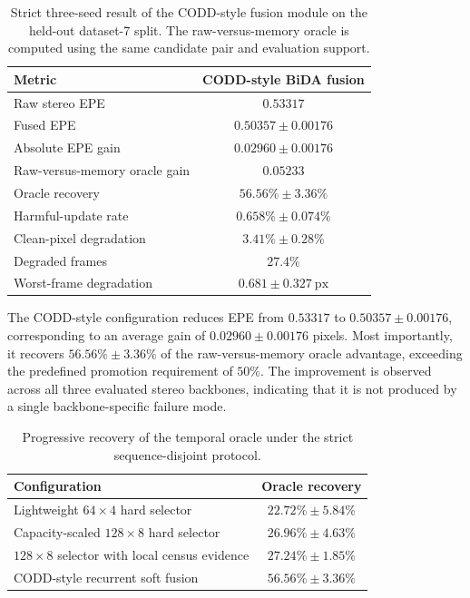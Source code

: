 \documentclass[11pt,a4paper]{article}
\begin{document}
\begin{table}[t]
    \centering
    \caption{Strict three-seed result of the CODD-style fusion module on the held-out
    dataset-7 split. The raw-versus-memory oracle is computed using the same candidate
    pair and evaluation support.}
    \label{tab:codd_style_main_result}
    \begin{tabular}{lc}
        \toprule
        Metric & CODD-style BiDA fusion \\
        \midrule
        Raw stereo EPE
            & \(0.53317\) \\
        Fused EPE
            & \(0.50357 \pm 0.00176\) \\
        Absolute EPE gain
            & \(0.02960 \pm 0.00176\) \\
        Raw-versus-memory oracle gain
            & \(0.05233\) \\
        Oracle recovery
            & \(56.56\% \pm 3.36\%\) \\
        Harmful-update rate
            & \(0.658\% \pm 0.074\%\) \\
        Clean-pixel degradation
            & \(3.41\% \pm 0.28\%\) \\
        Degraded frames
            & \(27.4\%\) \\
        Worst-frame degradation
            & \(0.681 \pm 0.327\ \mathrm{px}\) \\
        \bottomrule
    \end{tabular}
\end{table}

The CODD-style configuration reduces EPE from \(0.53317\) to
\(0.50357 \pm 0.00176\), corresponding to an average gain of
\(0.02960 \pm 0.00176\) pixels. Most importantly, it recovers
\(56.56\% \pm 3.36\%\) of the raw-versus-memory oracle advantage, exceeding the
predefined promotion requirement of \(50\%\). The improvement is observed across all
three evaluated stereo backbones, indicating that it is not produced by a single
backbone-specific failure mode.

\begin{table}[t]
    \centering
    \caption{Progressive recovery of the temporal oracle under the strict
    sequence-disjoint protocol.}
    \label{tab:oracle_recovery_progression}
    \begin{tabular}{lc}
        \toprule
        Configuration & Oracle recovery \\
        \midrule
        Lightweight \(64\times4\) hard selector
            & \(22.72\% \pm 5.84\%\) \\
        Capacity-scaled \(128\times8\) hard selector
            & \(26.96\% \pm 4.63\%\) \\
        \(128\times8\) selector with local census evidence
            & \(27.24\% \pm 1.85\%\) \\
        CODD-style recurrent soft fusion
            & \(\mathbf{56.56\% \pm 3.36\%}\) \\
        \bottomrule
    \end{tabular}
\end{table}
\end{document}
